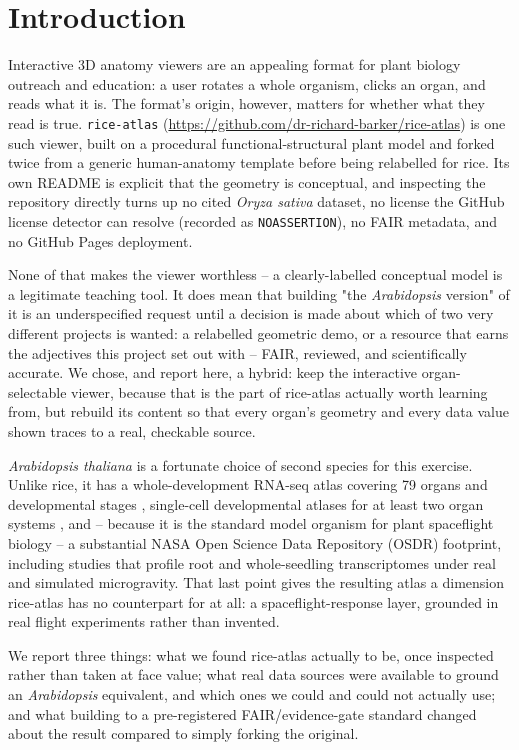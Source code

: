 \section{Introduction}

Interactive 3D anatomy viewers are an appealing format for plant biology outreach and
education: a user rotates a whole organism, clicks an organ, and reads what it is. The
format's origin, however, matters for whether what they read is true. \texttt{rice-atlas}
(\url{https://github.com/dr-richard-barker/rice-atlas}) is one such viewer, built on a
procedural functional-structural plant model and forked twice from a generic human-anatomy
template before being relabelled for rice. Its own README is explicit that the geometry is
conceptual, and inspecting the repository directly turns up no cited \textit{Oryza sativa}
dataset, no license the GitHub license detector can resolve (recorded as
\texttt{NOASSERTION}), no FAIR metadata, and no GitHub Pages deployment.

None of that makes the viewer worthless -- a clearly-labelled conceptual model is a
legitimate teaching tool. It does mean that building "the \textit{Arabidopsis} version" of
it is an underspecified request until a decision is made about which of two very different
projects is wanted: a relabelled geometric demo, or a resource that earns the adjectives
this project set out with -- FAIR, reviewed, and scientifically accurate. We chose, and
report here, a hybrid: keep the interactive organ-selectable viewer, because that is the
part of rice-atlas actually worth learning from, but rebuild its content so that every
organ's geometry and every data value shown traces to a real, checkable source.

\textit{Arabidopsis thaliana} is a fortunate choice of second species for this exercise.
Unlike rice, it has a whole-development RNA-seq atlas covering 79 organs and developmental stages
\citep{Klepikova2016}, single-cell developmental atlases for at least two organ systems
\citep{Shahan2022,Vijayan2021}, and -- because it is the standard model organism for plant
spaceflight biology -- a substantial NASA Open Science Data Repository (OSDR) footprint,
including studies that profile root and whole-seedling transcriptomes under real and
simulated microgravity. That last point gives the resulting atlas a dimension rice-atlas
has no counterpart for at all: a spaceflight-response layer, grounded in real flight
experiments rather than invented.

We report three things: what we found rice-atlas actually to be, once inspected rather
than taken at face value; what real data sources were available to ground an
\textit{Arabidopsis} equivalent, and which ones we could and could not actually use;
and what building to a pre-registered FAIR/evidence-gate standard changed about the
result compared to simply forking the original.
